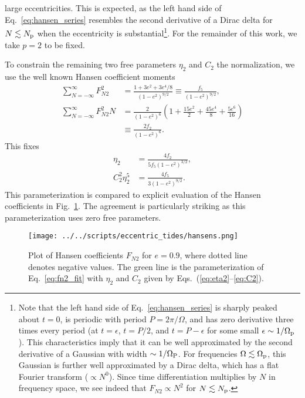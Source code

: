\documentclass[
        fleqn,
        usenatbib,
    ]{mnras}
\newcommand*{\p}[1]{\left(#1\right)}
\begin{document}
large eccentricities. This is expected, as the left hand side of
Eq.~\eqref{eq:hansen_series} resembles the second derivative of a Dirac delta
for $N \lesssim N_{\rm p}$ when the eccentricity is substantial\footnote{
Note that the left hand side of Eq.~\eqref{eq:hansen_series} is
sharply peaked about $t = 0$, is periodic with period $P = 2\pi / \Omega$, and
has zero derivative three times every period (at $t = \epsilon$, $t = P / 2$,
and $t = P - \epsilon$ for some small $\epsilon \sim 1 / \Omega_{\rm p}$). This
characteristics imply that it can be well approximated by the second derivative
of a Gaussian with width $\sim 1 / \Omega_{\rm P}$. For frequencies $\Omega
\lesssim \Omega_{\rm p}$, this Gaussian is further well approximated by a Dirac
delta, which has a flat Fourier transform ($\propto N^0$). Since time
differentiation multiplies by $N$ in frequency space, we see indeed that $F_{N2}
\propto N^2$ for $N \lesssim N_{\rm p}$.}. For the remainder of this work, we
take $p = 2$ to be fixed.

To constrain the remaining two free parameters $\eta_2$ and $C_2$ the
normalization, we use the well known Hansen coefficient moments
\citep{hut81}
\begin{align}
    \sum\limits_{N = -\infty}^\infty F_{N2}^2
        &= \frac{1 + 3e^2 + 3e^4/8}{\p{1 - e^2}^{9/2}}
            \equiv \frac{f_5}{\p{1 - e^2}^{9/2}},\\
    \sum\limits_{N = -\infty}^\infty F_{N2}^2N
        &= \frac{2}{\p{1 - e^2}^6}\p{1 + \frac{15e^2}{2}
            + \frac{45 e^4}{8} + \frac{5e^6}{16}}\nonumber\\
        &\equiv \frac{2f_2}{\p{1 - e^2}^6}.
\end{align}
This fixes
\begin{align}
    \eta_2 &= \frac{4f_2}{5f_5\p{1 - e^2}^{3/2}},\label{eq:eta2}\\
    C_2^2\eta_2^5 &= \frac{4f_5}{3\p{1 - e^2}^{9/2}}.\label{eq:C2}
\end{align}
This parameterization is compared to explicit evaluation of the Hansen
coefficients in Fig.~\ref{fig:hansens}. The agreement is particularly striking
as this parameterization uses zero free parameters.
\begin{figure}
    \centering
    \texttt{[image: ../../scripts/eccentric\_tides/hansens.png]}
    \caption{Plot of Hansen coefficients $F_{N2}$ for $e = 0.9$, where dotted
    line denotes negative values. The green line is the parameterization
    of Eq.~\eqref{eq:fn2_fit} with $\eta_2$ and $C_2$ given by
    Eqs.~(\ref{eq:eta2}--\ref{eq:C2}). }\label{fig:hansens}
\end{figure}
\end{document}
